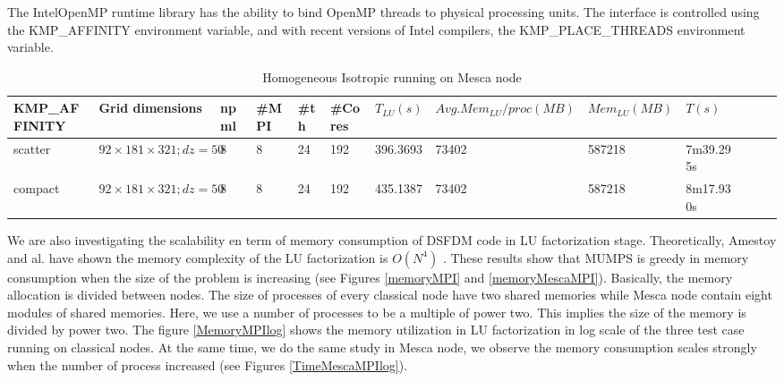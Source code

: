 The Intel\textregistered OpenMP runtime library has the ability to bind OpenMP threads to physical processing units. The interface is controlled using the KMP\_AFFINITY environment variable, and with recent versions of Intel compilers, the KMP\_PLACE\_THREADS environment variable.  

\begin{table}[!h]
\centering

\label{Mesca1}
\begin{tabular}{lllllllllllll}
KMP\_AFFINITY & Grid dimensions & npml & \#MPI & \#th & \#Cores & $T_{LU}(s)$ &$Avg. Mem_{LU}/proc(MB)$ & $Mem_{LU}(MB)$ & $T(s)$ \\
 \hline
scatter &	$92 \times 181 \times 321; dz=50$ &	8 &	8 &	24 & 192 &	396.3693 & 73402 &	587218 & 7m39.295s \\
compact &	$92 \times 181 \times 321; dz=50$ &	8 & 8 &	24 & 192 &	435.1387 & 73402 &	587218 & 8m17.930s

\end{tabular}
\caption{Homogeneous Isotropic running on Mesca node}
\end{table}

We are also investigating the scalability en term of memory consumption of DSFDM code in LU factorization stage. Theoretically, Amestoy and al. have shown the memory complexity of the LU factorization is $O(N^{4})$ \cite{Amestoy2016}. These results show that MUMPS is greedy in memory consumption when the size of the problem is increasing (see Figures \ref{memoryMPI} and \ref{memoryMescaMPI}). Basically, the memory allocation is divided between nodes. The size of processes of every classical node have two shared memories while Mesca node contain eight modules of shared memories. Here, we use a number of processes to be a multiple of power two. This implies the size of the memory is divided by power two. The figure \ref{MemoryMPIlog} shows the memory utilization in LU factorization in log scale of the three test case running on classical nodes. At the same time, we do the same study in Mesca node, we observe the memory consumption scales strongly when the number of process increased (see Figures \ref{TimeMescaMPIlog}).  

